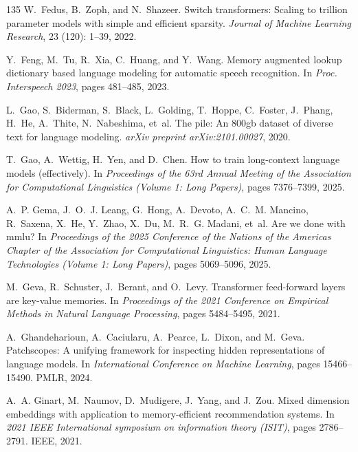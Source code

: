 \begin{thebibliography}{135}
W.~Fedus, B.~Zoph, and N.~Shazeer.
\newblock Switch transformers: Scaling to trillion parameter models with simple
  and efficient sparsity.
\newblock \emph{Journal of Machine Learning Research}, 23
  (120): 1--39, 2022.

Y.~Feng, M.~Tu, R.~Xia, C.~Huang, and Y.~Wang.
\newblock Memory augmented lookup dictionary based language modeling for
  automatic speech recognition.
\newblock In \emph{Proc. Interspeech 2023}, pages 481--485, 2023.

L.~Gao, S.~Biderman, S.~Black, L.~Golding, T.~Hoppe, C.~Foster, J.~Phang,
  H.~He, A.~Thite, N.~Nabeshima, et~al.
\newblock The pile: An 800gb dataset of diverse text for language modeling.
\newblock \emph{arXiv preprint arXiv:2101.00027}, 2020.

T.~Gao, A.~Wettig, H.~Yen, and D.~Chen.
\newblock How to train long-context language models (effectively).
\newblock In \emph{Proceedings of the 63rd Annual Meeting of the Association
  for Computational Linguistics (Volume 1: Long Papers)}, pages 7376--7399,
  2025.

A.~P. Gema, J.~O.~J. Leang, G.~Hong, A.~Devoto, A.~C.~M. Mancino, R.~Saxena,
  X.~He, Y.~Zhao, X.~Du, M.~R.~G. Madani, et~al.
\newblock Are we done with mmlu?
\newblock In \emph{Proceedings of the 2025 Conference of the Nations of the
  Americas Chapter of the Association for Computational Linguistics: Human
  Language Technologies (Volume 1: Long Papers)}, pages 5069--5096, 2025.

M.~Geva, R.~Schuster, J.~Berant, and O.~Levy.
\newblock Transformer feed-forward layers are key-value memories.
\newblock In \emph{Proceedings of the 2021 Conference on Empirical Methods in
  Natural Language Processing}, pages 5484--5495, 2021.

A.~Ghandeharioun, A.~Caciularu, A.~Pearce, L.~Dixon, and M.~Geva.
\newblock Patchscopes: A unifying framework for inspecting hidden
  representations of language models.
\newblock In \emph{International Conference on Machine Learning}, pages
  15466--15490. PMLR, 2024.

A.~A. Ginart, M.~Naumov, D.~Mudigere, J.~Yang, and J.~Zou.
\newblock Mixed dimension embeddings with application to memory-efficient
  recommendation systems.
\newblock In \emph{2021 IEEE International symposium on information theory
  (ISIT)}, pages 2786--2791. IEEE, 2021.


\end{thebibliography}
